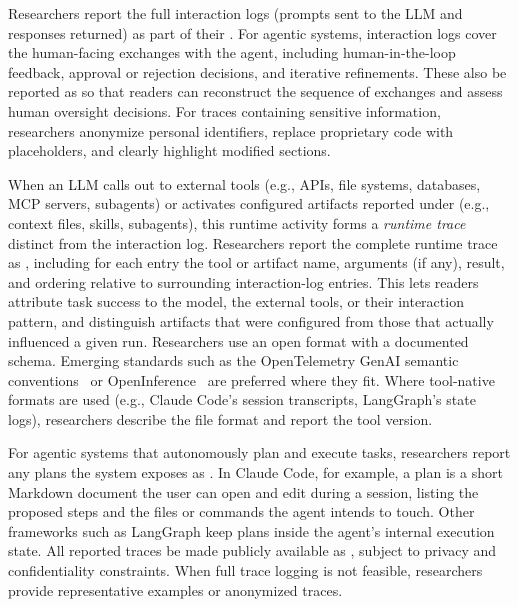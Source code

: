 
Researchers \should report the full interaction logs (prompts sent to the LLM and responses returned) as part of their \supplementarymaterial.
For agentic systems, interaction logs cover the human-facing exchanges with the agent, including human-in-the-loop feedback, approval or rejection decisions, and iterative refinements.
These \should also be reported as \supplementarymaterial so that readers can reconstruct the sequence of exchanges and assess human oversight decisions.
For traces containing sensitive information, researchers \must anonymize personal identifiers, replace proprietary code with placeholders, and clearly highlight modified sections.

When an LLM calls out to external tools (e.g., APIs, file systems, databases, MCP servers, subagents) or activates configured artifacts reported under \design (e.g., context files, skills, subagents), this runtime activity forms a \emph{runtime trace} distinct from the interaction log.
Researchers \should report the complete runtime trace as \supplementarymaterial, including for each entry the tool or artifact name, arguments (if any), result, and ordering relative to surrounding interaction-log entries.
This lets readers attribute task success to the model, the external tools, or their interaction pattern, and distinguish artifacts that were configured from those that actually influenced a given run.
Researchers \should use an open format with a documented schema. Emerging standards such as the OpenTelemetry GenAI semantic conventions~\cite{otel_genai_semconv} or OpenInference~\cite{openinference_spec} are preferred where they fit. Where tool-native formats are used (e.g., Claude Code's session transcripts, LangGraph's state logs), researchers \must describe the file format and report the tool version.

For agentic systems that autonomously plan and execute tasks, researchers \should report any plans the system exposes as \supplementarymaterial.
In Claude Code, for example, a plan is a short Markdown document the user can open and edit during a session, listing the proposed steps and the files or commands the agent intends to touch.
Other frameworks such as LangGraph keep plans inside the agent's internal execution state.
All reported traces \must be made publicly available as \supplementarymaterial, subject to privacy and confidentiality constraints. When full trace logging is not feasible, researchers \should provide representative examples or anonymized traces.

